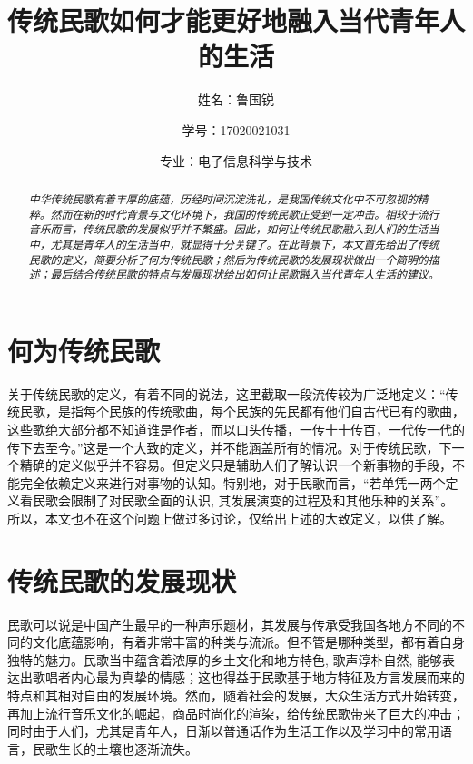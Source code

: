 \documentclass[UTF8,a4paper]{ctexart}
\title{传统民歌如何才能更好地融入当代青年人的生活}
\author{姓名：鲁国锐 \protect\newline
\and 学号：17020021031 \\
\and 专业：电子信息科学与技术}
\begin{document}
\maketitle

\begin{multicols}{2}

	\begin{abstract}
		\indent \textit{中华传统民歌有着丰厚的底蕴，历经时间沉淀洗礼，是我国传统文化中不可忽视的精粹。然而在新的时代背景与文化环境下，我国的传统民歌正受到一定冲击。相较于流行音乐而言，传统民歌的发展似乎并不繁盛。因此，如何让传统民歌融入到人们的生活当中，尤其是青年人的生活当中，就显得十分关键了。在此背景下，本文首先给出了传统民歌的定义，简要分析了何为传统民歌；然后为传统民歌的发展现状做出一个简明的描述；最后结合传统民歌的特点与发展现状给出如何让民歌融入当代青年人生活的建议。}
	\end{abstract}
	
	
	\section{何为传统民歌}\label{定义}
		\indent 关于传统民歌的定义，有着不同的说法，这里截取一段流传较为广泛地定义：“传统民歌，是指每个民族的传统歌曲，每个民族的先民都有他们自古代已有的歌曲，这些歌绝大部分都不知道谁是作者，而以口头传播，一传十十传百，一代传一代的传下去至今。”这是一个大致的定义，并不能涵盖所有的情况。对于传统民歌，下一个精确的定义似乎并不容易。但定义只是辅助人们了解认识一个新事物的手段，不能完全依赖定义来进行对事物的认知。特别地，对于民歌而言，“若单凭一两个定义看民歌会限制了对民歌全面的认识, 其发展演变的过程及和其他乐种的关系”\cite{yu1994给中国民歌下个定义}。所以，本文也不在这个问题上做过多讨论，仅给出上述的大致定义，以供了解。
	
	
	
	
	\section{传统民歌的发展现状}\label{现状}
		\indent 民歌可以说是中国产生最早的一种声乐题材\cite{yang2017浅析当代民歌艺术}，其发展与传承受我国各地方不同的不同的文化底蕴影响，有着非常丰富的种类与流派。但不管是哪种类型，都有着自身独特的魅力。民歌当中蕴含着浓厚的乡土文化和地方特色, 歌声淳朴自然, 能够表达出歌唱者内心最为真挚的情感\cite{ge2017中国民歌唱法的现状}；这也得益于民歌基于地方特征及方言发展而来的特点和其相对自由的发展环境。然而，随着社会的发展，大众生活方式开始转变，再加上流行音乐文化的崛起，商品时尚化的渲染，给传统民歌带来了巨大的冲击；同时由于人们，尤其是青年人，日渐以普通话作为生活工作以及学习中的常用语言，民歌生长的土壤也逐渐流失\cite{yang2017浅析当代民歌艺术}。
		

\end{multicols}
\end{document}
